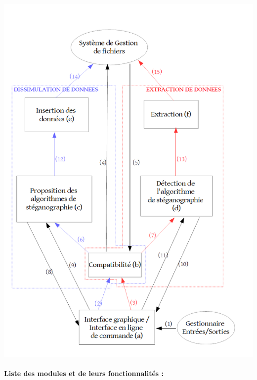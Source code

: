 \documentclass[11pt]{article}
\begin{document}
\hspace{1cm}
\includegraphics[scale=0.55]{pictures/Organigramme.png}

\paragraph{Liste des modules et de leurs fonctionnalités :}
\end{document}
